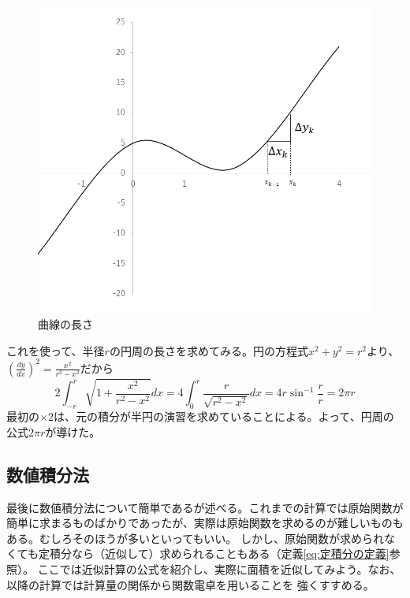 \documentclass[a4j,dvipdfmx]{jsarticle}
\begin{document}
                \begin{figure}[h]
                    \centering
                    \includegraphics[scale=0.35]{img/QuuNote/curve_length.png}
                    \caption{曲線の長さ}
                \end{figure}

                これを使って、半径$r$の円周の長さを求めてみる。円の方程式$x^2+y^2=r^2$より、$\displaystyle \left(\frac{dy}{dx}\right)^2=\frac{x^2}{r^2-x^2}$だから
                \begin{equation*}
                    2\int_{-r}^{r}\sqrt{1+\frac{x^2}{r^2-x^2}}dx=4\int_{0}^{r}\frac{r}{\sqrt{r^2-x^2}}dx=4r\sin^{-1}\frac{r}{r}=2\pi r
                \end{equation*}
                最初の$\times 2$は、元の積分が半円の演習を求めていることによる。よって、円周の公式$2\pi r$が導けた。
            \clearpage
            \subsection{数値積分法}
                最後に数値積分法について簡単であるが述べる。これまでの計算では原始関数が簡単に求まるものばかりであったが、実際は原始関数を求めるのが難しいものもある。むしろそのほうが多いといってもいい。
                しかし、原始関数が求められなくても定積分なら（近似して）求められることもある（定義\eqref{eq:定積分の定義}参照）。
                ここでは近似計算の公式を紹介し、実際に面積を近似してみよう。なお、以降の計算では計算量の関係から関数電卓を用いることを
                強くすすめる。
\end{document}
